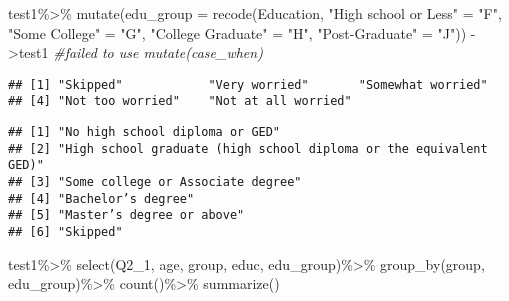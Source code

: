 \documentclass[
]{article}
\newenvironment{Shaded}{\begin{snugshade}}{\end{snugshade}}
\newcommand{\AttributeTok}[1]{\textcolor[rgb]{0.77,0.63,0.00}{#1}}
\newcommand{\CommentTok}[1]{\textcolor[rgb]{0.56,0.35,0.01}{\textit{#1}}}
\newcommand{\FunctionTok}[1]{\textcolor[rgb]{0.00,0.00,0.00}{#1}}
\newcommand{\NormalTok}[1]{#1}
\newcommand{\OtherTok}[1]{\textcolor[rgb]{0.56,0.35,0.01}{#1}}
\newcommand{\SpecialCharTok}[1]{\textcolor[rgb]{0.00,0.00,0.00}{#1}}
\newcommand{\StringTok}[1]{\textcolor[rgb]{0.31,0.60,0.02}{#1}}
\begin{document}
\begin{Shaded}
\begin{Highlighting}[]
\NormalTok{test1}\SpecialCharTok{\%\textgreater{}\%}
  \FunctionTok{mutate}\NormalTok{(}\AttributeTok{edu\_group =} \FunctionTok{recode}\NormalTok{(Education, }\StringTok{"High school or Less"} \OtherTok{=} \StringTok{"F"}\NormalTok{,}
                               \StringTok{"Some College"} \OtherTok{=} \StringTok{"G"}\NormalTok{,}
                               \StringTok{"College Graduate"} \OtherTok{=} \StringTok{"H"}\NormalTok{,}
                               \StringTok{"Post{-}Graduate"} \OtherTok{=} \StringTok{"J"}\NormalTok{)) }\OtherTok{{-}\textgreater{}}\NormalTok{test1}
\CommentTok{\#failed to use mutate(case\_when)}
\end{Highlighting}
\end{Shaded}

\begin{Shaded}
\end{Shaded}

\begin{verbatim}
## [1] "Skipped"            "Very worried"       "Somewhat worried"  
## [4] "Not too worried"    "Not at all worried"
\end{verbatim}

\begin{Shaded}
\end{Shaded}

\begin{verbatim}
## [1] "No high school diploma or GED"                                   
## [2] "High school graduate (high school diploma or the equivalent GED)"
## [3] "Some college or Associate degree"                                
## [4] "Bachelor’s degree"                                               
## [5] "Master’s degree or above"                                        
## [6] "Skipped"
\end{verbatim}

\begin{Shaded}
\begin{Highlighting}[]
\NormalTok{test1}\SpecialCharTok{\%\textgreater{}\%}
  \FunctionTok{select}\NormalTok{(Q2\_1, age, group, educ, edu\_group)}\SpecialCharTok{\%\textgreater{}\%}
  \FunctionTok{group\_by}\NormalTok{(group, edu\_group)}\SpecialCharTok{\%\textgreater{}\%}
  \FunctionTok{count}\NormalTok{()}\SpecialCharTok{\%\textgreater{}\%}
  \FunctionTok{summarize}\NormalTok{()}
\end{Highlighting}
\end{Shaded}
\end{document}
